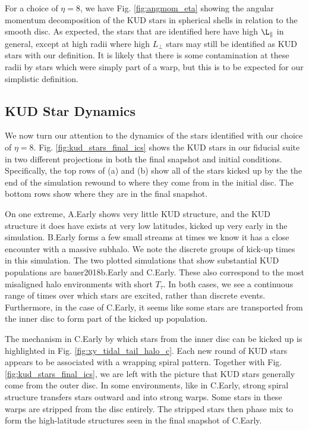 For a choice of $\eta=8$, we have Fig. \ref{fig:angmom_eta} showing the angular momentum decomposition of the KUD stars in spherical shells in relation to the smooth disc. As expected, the stars that are identified here have high $\L_\parallel$ in general, except at high radii where high $L_\perp$ stars may still be identified as KUD stars with our definition. It is likely that there is some contamination at these radii by stars which were simply part of a warp, but this is to be expected for our simplistic definition.


\subsection{KUD Star Dynamics} \label{ssec:kud_dynamics}


We now turn our attention to the dynamics of the stars identified with our choice of $\eta=8$. Fig. \ref{fig:kud_stars_final_ics} shows the KUD stars in our fiducial suite in two different projections in both the final snapshot and initial conditions. Specifically, the top rows of (a) and (b)  show all of the stars kicked up by the the end of the simulation rewound  to where they come from in the initial disc.  The bottom rows show where they are in the final snapshot.

On one extreme, A.Early shows very little KUD structure, and the KUD structure it does have exists at very low latitudes, kicked up very early in the simulation. B.Early forms a few small streams at times we know it has a close encounter with a massive subhalo. We note the discrete groups of kick-up times in this simulation. 
The two plotted simulations that show substantial KUD populations are bauer2018b.Early and C.Early. These also correspond to the most misaligned halo environments with short $T_\tau$. In both cases, we see a continuous range of times over which stars are excited, rather than discrete events. Furthermore, in the case of C.Early, it seems like some stars are transported from the inner disc to form part of the kicked up population.





The mechanism in C.Early by which stars from the inner disc can be kicked up is highlighted in Fig. \ref{fig:xy_tidal_tail_halo_c}. Each new round of KUD stars appears to be associated with a wrapping spiral pattern. Together with Fig. \ref{fig:kud_stars_final_ics}, we are left  with the picture that  KUD stars generally come from the outer disc. In some environments, like in C.Early, strong spiral structure transfers stars outward and into strong warps. Some stars in these warps are stripped from the disc entirely. The stripped stars then phase mix to form the high-latitude structures seen in the final snapshot of C.Early.


